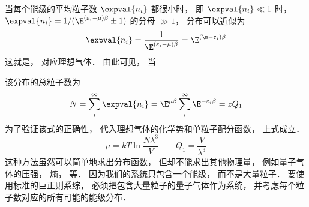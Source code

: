 当每个能级的平均粒子数 $\expval{n_i}$ 都很小时， 即 $\expval{n_i} \ll 1$ 时， $\expval{n_i} = 1/(\E^{(\varepsilon_i - \mu)\beta} \pm 1)$ 的分母 $ \gg 1$，  分布可以近似为
\begin{equation}
\expval{n_i} = \frac{1}{\E^{(\varepsilon_i - \mu )\beta }} = \E^{(\m  - \varepsilon_i)\beta}
\end{equation}
这就是， 对应理想气体． 由此可见， 当 %

该分布的总粒子数为
\begin{equation}
N = \sum_i^\infty \expval{n_i} = \E^{\mu \beta}\sum_i^\infty  \E^{-\varepsilon_i\beta}  = zQ_1
\end{equation}
为了验证该式的正确性， 代入理想气体的化学势和单粒子配分函数， 上式成立．
\begin{equation}
\mu  = kT\ln \frac{N\lambda^3}{V}  \qquad
Q_1 = \frac{V}{\lambda ^3}
\end{equation}
这种方法虽然可以简单地求出分布函数， 但却不能求出其他物理量， 例如量子气体的压强， 熵， 等． 因为我们的系统只包含一个能级， 而不是大量粒子． 要使用标准的巨正则系综， 必须把包含大量粒子的量子气体作为系统， 并考虑每个粒子数对应的所有可能的能级分布．
